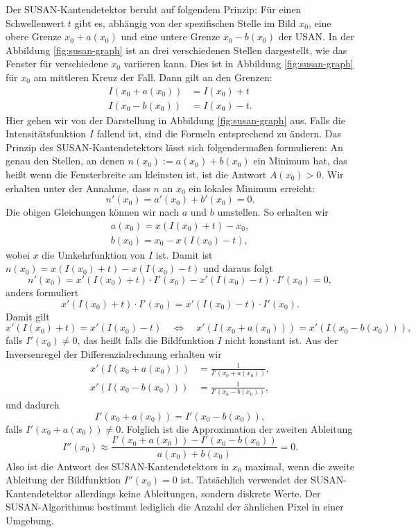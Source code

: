 \documentclass[a4paper, 11pt]{report}
\theoremstyle{definition}
\begin{document}
				Der SUSAN-Kantendetektor beruht auf folgendem Prinzip: Für einen Schwellenwert $t$ gibt es, abhängig von der spezifischen Stelle im Bild $x_0$, eine obere Grenze $x_0+a(x_0)$ und eine untere Grenze $x_0-b(x_0)$ der USAN. In der Abbildung \ref{fig:susan-graph} ist an drei verschiedenen Stellen dargestellt, wie das Fenster für verschiedene $x_0$ variieren kann. Dies ist in Abbildung \ref{fig:susan-graph} für $x_0$ am mittleren Kreuz der Fall.
				Dann gilt an den Grenzen:
				\begin{align*}
					I(x_0 + a(x_0)) &= I(x_0) + t \\
					I(x_0 - b(x_0)) &= I(x_0) - t.
				\end{align*}
				Hier gehen wir von der Darstellung in Abbildung \ref{fig:susan-graph} aus. Falls die Intensitätsfunktion $I$ fallend ist, sind die Formeln entsprechend zu ändern.
				Das Prinzip des SUSAN-Kantendetektors lässt sich folgendermaßen formulieren: An genau den Stellen, an denen $n(x_0) := a(x_0) + b(x_0)$ ein Minimum hat, das heißt wenn die Fensterbreite am kleinsten ist, ist die Antwort $A(x_0) > 0$. Wir erhalten unter der Annahme, dass $n$ an $x_0$ ein lokales Minimum erreicht:
				$$ n'(x_0) = a'(x_0) + b'(x_0) = 0. $$
				Die obigen Gleichungen können wir nach $a$ und $b$ umstellen. So erhalten wir
				\begin{align*}
					a(x_0) = x(I(x_0) + t) - x_0, \\
					b(x_0) = x_0 - x(I(x_0) - t),
				\end{align*}
				wobei $x$ die Umkehrfunktion von $I$ ist.
				Damit ist $n(x_0) = x(I(x_0) + t) - x(I(x_0) - t)$ und daraus folgt
				$$ n'(x_0) = x'(I(x_0) + t) \cdot I'(x_0) - x'(I(x_0) - t) \cdot I'(x_0) = 0,$$
				anders formuliert
				$$ x'(I(x_0) + t) \cdot I'(x_0) = x'(I(x_0) - t) \cdot I'(x_0). $$
				Damit gilt
				$$
					x'(I(x_0) + t) = x'(I(x_0) - t) \quad \iff \quad x'(I(x_0 + a(x_0))) = x'(I(x_0 - b(x_0))),
				$$
				falls $I'(x_0) \neq 0$, das heißt falls die Bildfunktion $I$ nicht konstant ist.
	 			Aus der Inversenregel der Differenzialrechnung erhalten wir
	 			\begin{align*}
	 				x'(I(x_0 + a(x_0))) &= \frac{1}{I'(x_0 + a(x_0))},\\
	 				x'(I(x_0 - b(x_0))) &= \frac{1}{I'(x_0 - b(x_0))},
	 			\end{align*}
	 			und dadurch
	 			$$ I'(x_0 + a(x_0)) = I'(x_0 - b(x_0)), $$
	 			falls $I'(x_0 + a(x_0)) \neq 0$.
	 			Folglich ist die Approximation der zweiten Ableitung
	 			$$I''(x_0) \approx \frac{I'(x_0 + a(x_0)) - I'(x_0 - b(x_0))}{a(x_0) + b(x_0)} = 0.$$
	 			Also ist die Antwort des SUSAN-Kantendetektors in $x_0$ maximal, wenn die zweite Ableitung der Bildfunktion $I''(x_0) = 0$ ist. Tatsächlich verwendet der SUSAN-Kantendetektor allerdings keine Ableitungen, sondern diskrete Werte. Der SUSAN-Algorithmus bestimmt lediglich die Anzahl der ähnlichen Pixel in einer Umgebung.
\end{document}
